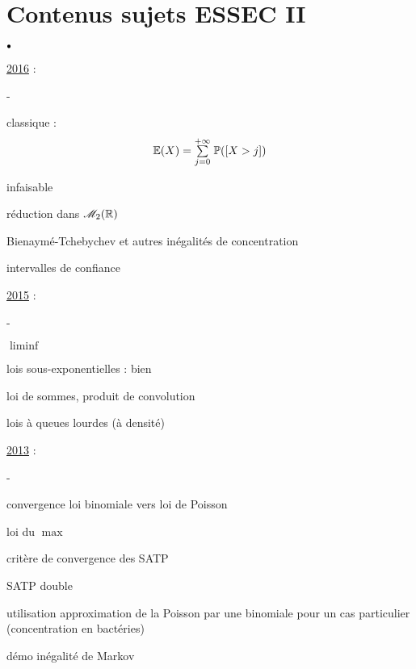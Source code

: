 \documentclass[11pt]{book}%
\begin{document}
\chapter*{Contenus sujets ESSEC II}

\begin{noliste}{$\scriptstyle \bullet$}
\item  \underline{2016} :
 \begin{noliste}{-}
  \item  classique :
  \[
   \mathbb{E}(X)={\textstyle\sum\limits_{j=0}^{+\infty}}\hspace{.1cm} \mathbb{P}(\left[ {X>j} \right])
  \]
  
  \item \Scilab{} infaisable
  
  \item réduction dans $\mathscr{M}_{2}(\mathbb{R})$
  
  \item Bienaymé-Tchebychev et autres inégalités de concentration
  
  \item intervalles de confiance
 \end{noliste}

\item \underline{2015} :
 \begin{noliste}{-}
  \item $\liminf$
  
  \item lois sous-exponentielles : bien
  
  \item loi de sommes, produit de convolution
  
  \item lois à queues lourdes (\var à densité)
 \end{noliste}
 
\item \underline{2013} :
 \begin{noliste}{-}
  \item convergence loi binomiale vers loi de Poisson
  
  \item loi du $\max$
  
  \item critère de convergence des SATP
  
  \item SATP double
  
  \item utilisation approximation de la Poisson par une binomiale pour 
  un cas particulier (concentration en bactéries)
  
  \item démo inégalité de Markov
  

\end{noliste}
\end{noliste}
\end{document}
